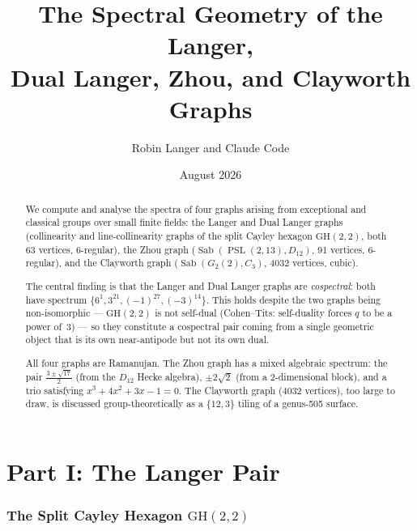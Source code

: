 \documentclass[11pt,a4paper]{article}
\title{\textbf{The Spectral Geometry of the Langer,\\
Dual Langer, Zhou, and Clayworth Graphs}}
\author{Robin Langer and Claude Code}
\date{August 2026}
\theoremstyle{plain}
\theoremstyle{definition}
\newcommand{\Sab}{\operatorname{Sab}}
\newcommand{\PSL}{\operatorname{PSL}}
\newcommand{\GH}{\mathrm{GH}}
\begin{document}
\maketitle

\begin{abstract}
We compute and analyse the spectra of four graphs arising from exceptional and
classical groups over small finite fields: the Langer and Dual Langer graphs
(collinearity and line-collinearity graphs of the split Cayley hexagon
$\GH(2,2)$, both 63 vertices, 6-regular), the Zhou graph
($\Sab(\PSL(2,13), D_{12})$, 91 vertices, 6-regular), and the Clayworth graph
($\Sab(G_2(2), C_3)$, 4032 vertices, cubic).

The central finding is that the Langer and Dual Langer graphs are
\emph{cospectral}: both have spectrum $\{6^1, 3^{21}, (-1)^{27}, (-3)^{14}\}$.
This holds despite the two graphs being non-isomorphic --- $\GH(2,2)$ is not
self-dual (Cohen--Tits: self-duality forces $q$ to be a power of~3) --- so they
constitute a cospectral pair coming from a single geometric object that is its
own near-antipode but not its own dual.

All four graphs are Ramanujan. The Zhou graph has a mixed algebraic spectrum:
the pair $\frac{3\pm\sqrt{17}}{2}$ (from the $D_{12}$ Hecke algebra), $\pm
2\sqrt{2}$ (from a 2-dimensional block), and a trio satisfying
$x^3 + 4x^2 + 3x - 1 = 0$. The Clayworth graph (4032 vertices), too large to
draw, is discussed group-theoretically as a $\{12,3\}$ tiling of a genus-505
surface.
\end{abstract}

\tableofcontents

\bigskip

\part*{Part I: The Langer Pair}

\section{The Split Cayley Hexagon $\GH(2,2)$}
\end{document}
